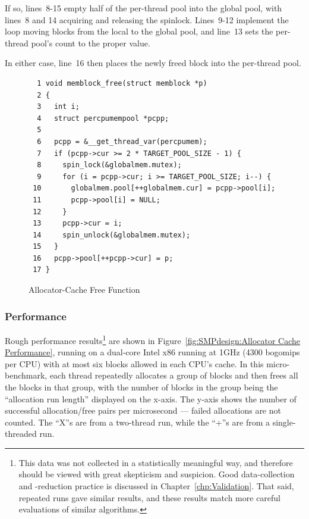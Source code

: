 If so, lines~8-15 empty half of the per-thread pool into the global pool,
with lines~8 and 14 acquiring and releasing the spinlock.
Lines~9-12 implement the loop moving blocks from the local to the
global pool, and line~13 sets the per-thread pool's count to the proper
value.

In either case, line~16 then places the newly freed block into the
per-thread pool.

\begin{figure}[htbp]
{ \scriptsize
\begin{verbatim}
  1 void memblock_free(struct memblock *p)
  2 {
  3   int i;
  4   struct percpumempool *pcpp;
  5
  6   pcpp = &__get_thread_var(percpumem);
  7   if (pcpp->cur >= 2 * TARGET_POOL_SIZE - 1) {
  8     spin_lock(&globalmem.mutex);
  9     for (i = pcpp->cur; i >= TARGET_POOL_SIZE; i--) {
 10       globalmem.pool[++globalmem.cur] = pcpp->pool[i];
 11       pcpp->pool[i] = NULL;
 12     }
 13     pcpp->cur = i;
 14     spin_unlock(&globalmem.mutex);
 15   }
 16   pcpp->pool[++pcpp->cur] = p;
 17 }
\end{verbatim}
}
\caption{Allocator-Cache Free Function}
\label{fig:SMPdesign:Allocator-Cache Free Function}
\end{figure}

\subsubsection{Performance}

Rough performance results\footnote{
	This data was not collected in a statistically meaningful way,
	and therefore should be viewed with great skepticism and suspicion.
	Good data-collection and -reduction practice is discussed
	in Chapter~\ref{chp:Validation}.
	That said, repeated runs gave similar results, and these results
	match more careful evaluations of similar algorithms.}
are shown in
Figure~\ref{fig:SMPdesign:Allocator Cache Performance},
running on a dual-core Intel x86 running at 1GHz (4300 bogomips per CPU)
with at most six blocks allowed in each CPU's cache.
In this micro-benchmark,
each thread repeatedly allocates a group of blocks and then frees all
the blocks in that group, with
the number of blocks in the group being the ``allocation run length''
displayed on the x-axis.
The y-axis shows the number of successful allocation/free pairs per
microsecond --- failed allocations are not counted.
The ``X''s are from a two-thread run, while the ``+''s are from a
single-threaded run.

